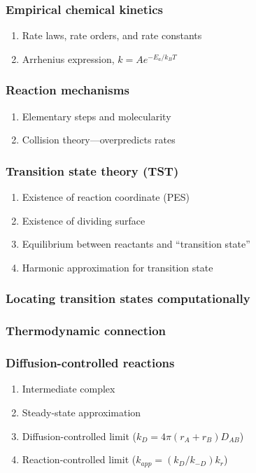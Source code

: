 \documentclass[11pt]{article}
\begin{document}
\subsubsection{Empirical chemical kinetics}
\label{sec:org48f517f}
\begin{enumerate}
\item Rate laws, rate orders, and rate constants
\item Arrhenius expression, \(k=A e^{-E_a/k_BT}\)
\end{enumerate}
\subsubsection{Reaction mechanisms}
\label{sec:org4407d1b}
\begin{enumerate}
\item Elementary steps and molecularity
\item Collision theory---overpredicts rates
\end{enumerate}
\subsubsection{Transition state theory (TST)}
\label{sec:orgf81e4d2}
\begin{enumerate}
\item Existence of reaction coordinate (PES)
\item Existence of dividing surface
\item Equilibrium between reactants and ``transition state''
\item Harmonic approximation for transition state
\end{enumerate}
\subsubsection{Locating transition states computationally}
\label{sec:orgfea99be}
\subsubsection{Thermodynamic connection}
\label{sec:org4515a9d}
\subsubsection{Diffusion-controlled reactions}
\label{sec:orga89a4bd}
\begin{enumerate}
\item Intermediate complex
\item Steady-state approximation
\item Diffusion-controlled limit (\(k_D = 4\pi (r_A + r_B) D_{AB}\))
\item Reaction-controlled limit (\(k_{app}=(k_D/k_{-D})k_r\))
\end{enumerate}
\end{document}
